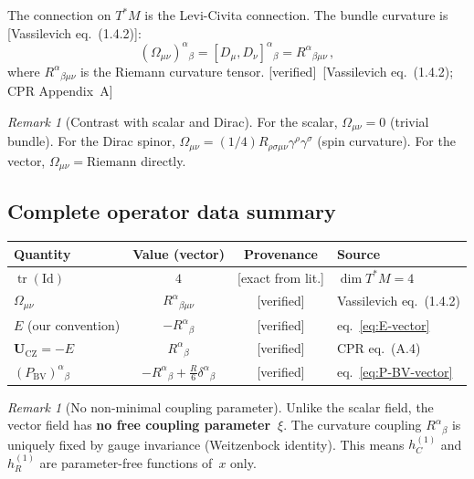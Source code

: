 \documentclass[12pt,a4paper]{article}
\theoremstyle{definition}
\theoremstyle{remark}
\newtheorem{remark}[proposition]{Remark}
\newcommand{\tr}{\operatorname{tr}}
\newcommand{\Id}{\mathrm{Id}}
\newcommand{\fromlit}[1]{\textcolor{blue!70!black}{\textsf{[#1]}}}
\newcommand{\exactlit}{\textcolor{blue!60!black}{\textsf{[exact from lit.]}}}
\newcommand{\verified}{\textcolor{green!50!black}{\textsf{[verified]}}}
\begin{document}
The connection on $T^*M$ is the Levi-Civita connection.
The bundle curvature is \fromlit{Vassilevich eq.~(1.4.2)}:
\begin{equation}
  \boxed{
  (\Omega_{\mu\nu})^\alpha{}_\beta = [D_\mu, D_\nu]^\alpha{}_\beta
  = R^\alpha{}_{\beta\mu\nu}\,,
  }
  \label{eq:Omega-vector}
\end{equation}
where $R^\alpha{}_{\beta\mu\nu}$ is the Riemann curvature tensor.
\verified\ \fromlit{Vassilevich eq.~(1.4.2); CPR Appendix~A}

\begin{remark}[Contrast with scalar and Dirac]
For the scalar, $\Omega_{\mu\nu} = 0$ (trivial bundle).
For the Dirac spinor, $\Omega_{\mu\nu} = (1/4)R_{\rho\sigma\mu\nu}
\gamma^\rho\gamma^\sigma$ (spin curvature).
For the vector, $\Omega_{\mu\nu} = \mathrm{Riemann}$ directly.
\end{remark}


\subsection{Complete operator data summary}

\begin{center}
\renewcommand{\arraystretch}{1.4}
\begin{tabular}{lccl}
\toprule
\textbf{Quantity} & \textbf{Value (vector)} & \textbf{Provenance}
  & \textbf{Source} \\
\midrule
$\tr(\Id)$ & $4$ & \exactlit & $\dim T^*M = 4$ \\
$\Omega_{\mu\nu}$ & $R^\alpha{}_{\beta\mu\nu}$ & \verified
  & Vassilevich eq.~(1.4.2) \\
$E$ (our convention) & $-R^\alpha{}_\beta$ & \verified
  & eq.~\eqref{eq:E-vector} \\
$\mathbf{U}_{\mathrm{CZ}} = -E$ & $R^\alpha{}_\beta$ & \verified
  & CPR eq.~(A.4) \\
$(P_{\mathrm{BV}})^\alpha{}_\beta$
  & $-R^\alpha{}_\beta + \frac{R}{6}\delta^\alpha{}_\beta$
  & \verified & eq.~\eqref{eq:P-BV-vector} \\
\bottomrule
\end{tabular}
\end{center}

\begin{remark}[No non-minimal coupling parameter]
\label{rem:no-xi}
Unlike the scalar field, the vector field has \textbf{no free
coupling parameter~$\xi$}.  The curvature coupling
$R^\alpha{}_\beta$ is uniquely fixed by gauge invariance
(Weitzenbock identity).  This means $h_C^{(1)}$ and $h_R^{(1)}$
are parameter-free functions of~$x$ only.
\end{remark}
\end{document}
